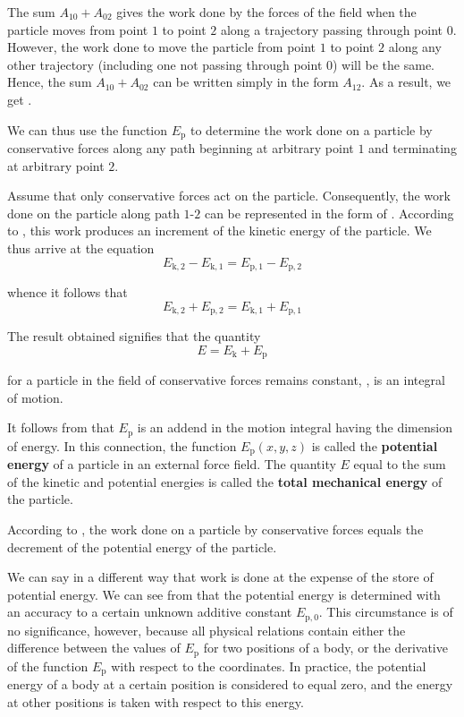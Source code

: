 \noindent
The sum $A_{10}+A_{02}$ gives the work done by the forces of the field when the particle moves from point $1$ to point $2$ along a trajectory passing through point $0$. However, the work done to move the particle from point $1$ to point $2$ along any other trajectory (including one not passing through point $0$) will be the same. Hence, the sum $A_{10}+A_{02}$ can be written simply in the form $A_{12}$. As a result, we get .

We can thus use the function $E_{\text{p}}$ to determine the work done on a particle by conservative forces along any path beginning at arbitrary point $1$ and terminating at arbitrary point $2$.

Assume that only conservative forces act on the particle. Consequently, the work done on the particle along path $1$-$2$ can be represented in the form of . According to , this work produces an increment of the kinetic energy of the particle. We thus arrive at the equation
\begin{equation*}
E_{\text{k},2} - E_{\text{k},1} = E_{\text{p},1} - E_{\text{p},2}
\end{equation*}

\noindent
whence it follows that
\begin{equation*}
E_{\text{k},2} + E_{\text{p},2} = E_{\text{k},1} + E_{\text{p},1}
\end{equation*}

\noindent
The result obtained signifies that the quantity
\begin{equation}\label{eq:3_28}
E = E_{\text{k}} + E_{\text{p}}
\end{equation}

\noindent
for a particle in the field of conservative forces remains constant, \ie, is an integral of motion.

It follows from  that $E_{\text{p}}$ is an addend in the motion integral having the dimension of energy. In this connection, the function $E_{\text{p}}(x,y,z)$ is called the \textbf{potential energy} of a particle in an external force field. The quantity $E$ equal to the sum of the kinetic and potential energies is called the \textbf{total mechanical energy} of the particle.

According to , the work done on a particle by conservative forces equals the decrement of the potential energy of the particle.

We can say in a different way that work is done at the expense of the store of potential energy. We can see from  that the potential energy is determined with an accuracy to a certain unknown additive constant $E_{\text{p},0}$. This circumstance is of no significance, however, because all physical relations contain either the difference between the values of $E_{\text{p}}$ for two positions of a body, or the derivative of the function $E_{\text{p}}$ with respect to the coordinates. In practice, the potential energy of a body at a certain position is considered to equal zero, and the energy at other positions is taken with respect to this energy.

